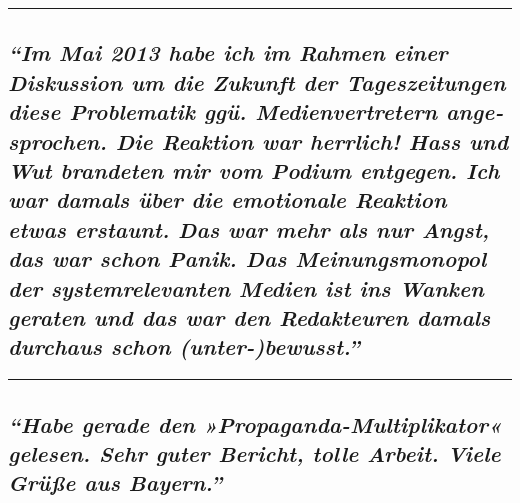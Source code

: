 \begin{center}\rule{0.5\linewidth}{\linethickness}\end{center}

\hypertarget{im-mai-2013-habe-ich-im-rahmen-einer-diskussion-um-die-zukunft-der-tageszeitungen-diese-problematik-gguxfc-medienvertretern-angesprochen-die-reaktion-war-herrlich-hass-und-wut-brandeten-mir-vom-podium-entgegen-ich-war-damals-uxfcber-die-emotionale-reaktion-etwas-erstaunt-das-war-mehr-als-nur-angst-das-war-schon-panik-das-meinungsmonopol-der-systemrelevanten-medien-ist-ins-wanken-geraten-und-das-war-den-redakteuren-damals-durchaus-schon-unter-bewusst}{%
\subsection{\texorpdfstring{\emph{``Im Mai 2013 habe ich im Rahmen einer
Diskussion um die Zukunft der Tages­zei­tungen diese Proble­matik ggü.
Medien­ver­tretern ange­sprochen. Die Reaktion war herrlich! Hass und
Wut brandeten mir vom Podium entgegen. Ich war damals über die
emotionale Reaktion etwas erstaunt. Das war mehr als nur Angst, das war
schon Panik. Das Meinungs­monopol der system­rele­vanten Medien ist ins
Wanken geraten und das war den Redakteuren damals durchaus schon
(unter-)bewusst.''}}{``Im Mai 2013 habe ich im Rahmen einer Diskussion um die Zukunft der Tages­zei­tungen diese Proble­matik ggü. Medien­ver­tretern ange­sprochen. Die Reaktion war herrlich! Hass und Wut brandeten mir vom Podium entgegen. Ich war damals über die emotionale Reaktion etwas erstaunt. Das war mehr als nur Angst, das war schon Panik. Das Meinungs­monopol der system­rele­vanten Medien ist ins Wanken geraten und das war den Redakteuren damals durchaus schon (unter-)bewusst.''}}\label{im-mai-2013-habe-ich-im-rahmen-einer-diskussion-um-die-zukunft-der-tageszeitungen-diese-problematik-gguxfc-medienvertretern-angesprochen-die-reaktion-war-herrlich-hass-und-wut-brandeten-mir-vom-podium-entgegen-ich-war-damals-uxfcber-die-emotionale-reaktion-etwas-erstaunt-das-war-mehr-als-nur-angst-das-war-schon-panik-das-meinungsmonopol-der-systemrelevanten-medien-ist-ins-wanken-geraten-und-das-war-den-redakteuren-damals-durchaus-schon-unter-bewusst}}

\begin{center}\rule{0.5\linewidth}{\linethickness}\end{center}

\hypertarget{habe-gerade-den-propaganda-multiplikator-gelesen-sehr-guter-bericht-tolle-arbeit-viele-gruxfcuxdfe-aus-bayern}{%
\subsection{\texorpdfstring{\emph{``Habe gerade den
»Propaganda-Multiplikator« gelesen. Sehr guter Bericht, tolle Arbeit.
Viele Grüße aus
Bayern.''}}{``Habe gerade den »Propaganda-Multiplikator« gelesen. Sehr guter Bericht, tolle Arbeit. Viele Grüße aus Bayern.''}}\label{habe-gerade-den-propaganda-multiplikator-gelesen-sehr-guter-bericht-tolle-arbeit-viele-gruxfcuxdfe-aus-bayern}}

